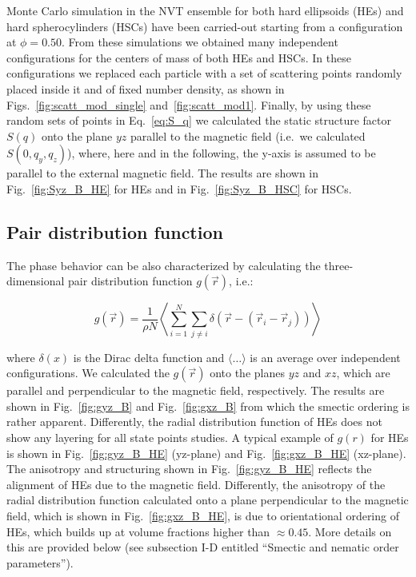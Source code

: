 \documentclass[aip,graphicx]{revtex4-1} %
\begin{document}
Monte Carlo simulation in the NVT ensemble for both hard ellipsoids (HEs) and hard spherocylinders (HSCs) have been carried-out 
starting from a configuration at $\phi = 0.50$.
From these simulations we obtained many independent configurations for the centers of mass of both HEs and HSCs. 
In these configurations we replaced each particle with a set of scattering points randomly placed inside it and 
of fixed number density, as shown in Figs.~\ref{fig:scatt_mod_single} and~\ref{fig:scatt_mod1}. 
Finally, by using these random sets of points in Eq.~\ref{eq:S_q} we calculated the static structure factor $S(q)$ 
onto the plane $yz$ parallel to the magnetic field (i.e.~we calculated $S(0, q_y, q_z)$), where, here and in the following,
the y-axis is assumed to be parallel to the external magnetic field.
The results are shown in Fig.~\ref{fig:Syz_B_HE} for HEs and in Fig.~\ref{fig:Syz_B_HSC} for HSCs.

\subsection{Pair distribution function}

The phase behavior can be also characterized by calculating the three-dimensional pair distribution function $g(\vec{r})$, i.e.:

\begin{equation}
    g(\vec{r}) = \frac{1}{\rho N} \left\langle \sum_{i=1}^N \sum_{j\neq i} \delta \left( \vec{r} - \left( \vec{r}_i - \vec{r}_j \right) \right) \right\rangle
\end{equation}

where $\delta(x)$ is the Dirac delta function and $\langle\ldots\rangle$ is an average over independent configurations.
We calculated the $g(\vec{r})$ onto the planes $yz$ and $xz$, which are parallel and perpendicular to the magnetic field, respectively. 
The results are shown in Fig.~\ref{fig:gyz_B} and Fig.~\ref{fig:gxz_B} from which the smectic ordering is rather apparent.
Differently, the radial distribution function of HEs does not show any
layering for all state points studies. A typical example of $g(r)$ for HEs is shown in Fig.~\ref{fig:gyz_B_HE} (yz-plane) and 
Fig.~\ref{fig:gxz_B_HE} (xz-plane). The anisotropy and structuring shown in Fig.~\ref{fig:gyz_B_HE} reflects the alignment 
of HEs due to the magnetic field. Differently, the anisotropy
of the radial distribution function calculated onto a plane perpendicular to the magnetic field, which is shown in 
Fig.~\ref{fig:gxz_B_HE}, is due to orientational ordering of HEs, which builds up at volume fractions higher than $\approx 0.45$.  
More details on this are provided below (see subsection I-D entitled ``Smectic and nematic order parameters'').
\end{document}
